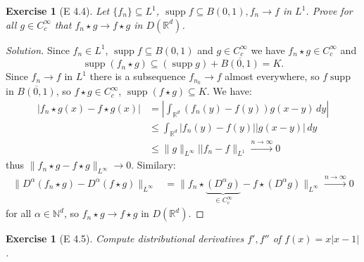 \documentclass{report}
\theoremstyle{tommy}
\newtheorem{ex}[defn]{Exercise}
\newcommand{\supp}{\operatorname{supp}}
\begin{document}
  \begin{ex}[E 4.4]
    Let \(\{f_n\} \subseteq L^1\), \(\supp f \subseteq B(0,1), f_n \to f\) in \(L^1\). Prove for all \(g \in C_c^\infty\) that \(f_n \star g \to f \star g\) in \(D(\mathbb{R}^d)\).
  \end{ex}

  \begin{proof}[Solution]
    Since \(f_n \in L^1\), \(\supp f \subseteq B(0,1)\) and \(g \in C_c^\infty\) we have \(f_n \star g \in C_c^\infty\) and \[\supp(f_n \star g) \subseteq (\supp g) + \overline{B(0,1)} = K.\] Since \(f_n \to f\) in \(L^1\) there is a subsequence \(f_{n_k} \to f\) almost everywhere, so \(f \supp\) in \(\overline{B(0,1)}\), so \(f \star g \in C_c^\infty\), \(\supp(f \star g) \subseteq K\). We have:
    \begin{align*}
      |f_n \star g(x) - f \star g(x)| 
      &= \left|\int_{\mathbb{R}^d} (f_n(y)-f(y))g(x-y) \, dy \right| \\
      &\le \int_{\mathbb{R}^d} |f_n(y) - f(y)| |g(x-y)| \, dy \\
      &\le \|g\|_{L^\infty} ||f_n - f\|_{L^1} 
      \xrightarrow{n \to \infty} 0
    \end{align*}
    thus \(\|f_n \star g - f \star g\|_{L^\infty} \to 0\). Similary:
    \begin{align*}
      \|D^\alpha(f_n \star g) - D^\alpha (f\star g)\|_{L^\infty} 
      &= \|f_n \star \underbrace{(D^\alpha g)}_{\in C_c^\infty} - f \star (D^\alpha g)\|_{L^\infty} \xrightarrow{n \to \infty} 0
    \end{align*}
    for all \(\alpha \in \mathbb{N}^d\), so \(f_n \star g \to f \star g\) in \(D(\mathbb{R}^d)\).
  \end{proof}

  \begin{ex}[E 4.5]
    Compute distributional derivatives \(f', f''\) of \(f(x) = x|x-1|\).
  \end{ex}
\end{document}
